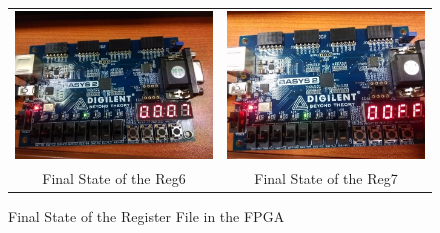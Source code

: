 \documentclass[a4paper]{article}
\begin{document}
\begin{figure}[ht!]
\begin{tabular}{c|c}
        \includegraphics[scale=0.3]{reg6}&\includegraphics[scale=0.3]{reg7}\\
        Final State of the Reg6\label{fig:reg6}&Final State of the Reg7\label{fig:reg7}
    \end{tabular}
    \caption{Final State of the Register File in the FPGA}\label{tab:fpga}
\end{figure}
\end{document}
